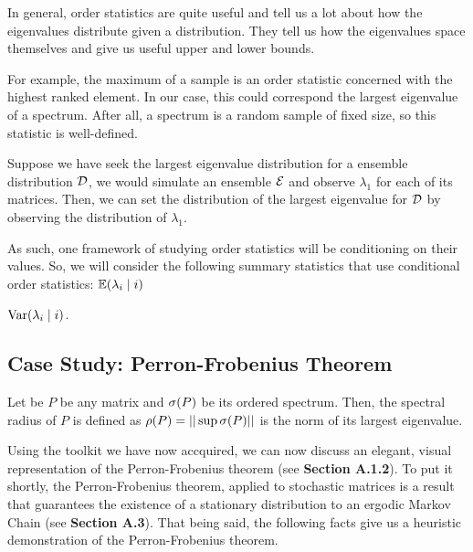 In general, order statistics are quite useful and tell us a lot about how the eigenvalues distribute given a distribution.
They tell us how the eigenvalues space themselves and give us useful upper and lower bounds.

For example, the maximum of a sample is an order statistic concerned with the highest ranked element.
In our case, this could correspond the largest eigenvalue of a spectrum. After all, a spectrum is a random sample of fixed size, so this statistic is well-defined.

\begin{example}
Suppose we have seek the largest eigenvalue distribution for a ensemble distribution $\mathcal{D}$, we would simulate an ensemble $\mathcal{E}$ and observe $\lambda_1$ for each of its matrices.
Then, we can set the distribution of the largest eigenvalue for $\mathcal{D}$ by observing the distribution of $\lambda_1$.
\end{example}


As such, one framework of studying order statistics will be conditioning on their values. So, we will consider the following summary statistics that use conditional order statistics:
 $\mathbb{E}(\lambda_{i} \mid i)$

 $\text{Var}(\lambda_{i} \mid i)$.

\newpage
\subsection{Case Study: Perron-Frobenius Theorem}

\begin{definition}
  Let be $P$ be any matrix and $\sigma(P)$ be its ordered spectrum. Then, the spectral radius of $P$ is defined as $\rho(P) = ||\sup \sigma(P)||$ is the norm of its largest eigenvalue.
\end{definition}


Using the toolkit we have now accquired, we can now discuss an elegant, visual representation of the Perron-Frobenius theorem (see \textbf{Section A.1.2}).
To put it shortly, the Perron-Frobenius theorem, applied to stochastic matrices is a result that guarantees the existence of a stationary distribution to an ergodic Markov Chain (see \textbf{Section A.3}).
That being said, the following facts give us a heuristic demonstration of the Perron-Frobenius theorem.

